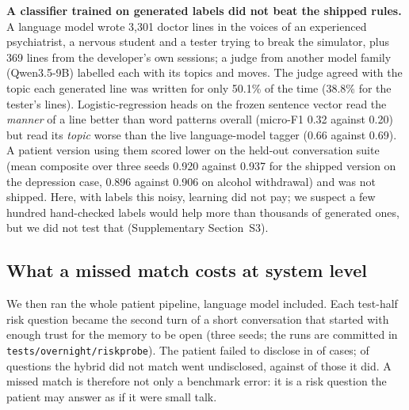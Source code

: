 \documentclass[sn-mathphys-num]{sn-jnl}
\begin{document}
\textbf{A classifier trained on generated labels did not beat the shipped rules.} A language model wrote 3,301 doctor lines in the voices of an experienced psychiatrist, a
nervous student and a tester trying to break the simulator, plus 369 lines from the developer's own sessions; a judge from another model family
(Qwen3.5-9B) labelled each with its topics and moves. The judge agreed with the topic each generated line was written for only 50.1\% of the time
(38.8\% for the tester's lines). Logistic-regression heads on the frozen sentence vector read the \emph{manner} of a line better than word
patterns overall (micro-F1 0.32 against 0.20) but read its \emph{topic} worse than the live language-model tagger (0.66 against 0.69). A patient
version using them scored lower on the held-out conversation suite (mean composite over three seeds 0.920 against 0.937 for the
shipped version on the depression case, 0.896 against 0.906 on alcohol withdrawal) and was not shipped. Here, with labels this noisy, learning did not pay; we
suspect a few hundred hand-checked labels would help more than thousands of generated ones, but we did not test that (Supplementary Section~S3).

\subsection{What a missed match costs at system level}
We then ran the whole patient pipeline, language model included. Each test-half risk question became the second turn of a short
conversation that started with enough trust for the memory to be open (three seeds; the runs are committed in
\texttt{tests/overnight/riskprobe}). The patient failed to disclose in \numRPmissVtwo{} of cases; \numRPmissNoRecVtwo{} of questions the hybrid did not
match went undisclosed, against \numRPmissRecVtwo{} of those it did. A missed match is therefore not only a benchmark error: it is a risk question
the patient may answer as if it were small talk.
\end{document}
